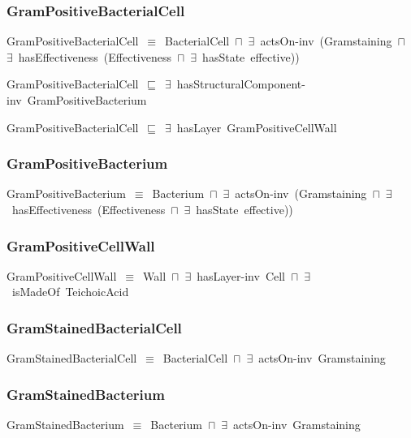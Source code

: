 \documentclass{article}
\begin{document}
\subsubsection*{GramPositiveBacterialCell}

GramPositiveBacterialCell~\ensuremath{\equiv}~BacterialCell~\ensuremath{\sqcap}~\ensuremath{\exists}~actsOn-inv~(Gramstaining~\ensuremath{\sqcap}~\ensuremath{\exists}~hasEffectiveness~(Effectiveness~\ensuremath{\sqcap}~\ensuremath{\exists}~hasState~effective))

GramPositiveBacterialCell~\ensuremath{\sqsubseteq}~\ensuremath{\exists}~hasStructuralComponent-inv~GramPositiveBacterium~

GramPositiveBacterialCell~\ensuremath{\sqsubseteq}~\ensuremath{\exists}~hasLayer~GramPositiveCellWall~

\subsubsection*{GramPositiveBacterium}

GramPositiveBacterium~\ensuremath{\equiv}~Bacterium~\ensuremath{\sqcap}~\ensuremath{\exists}~actsOn-inv~(Gramstaining~\ensuremath{\sqcap}~\ensuremath{\exists}~hasEffectiveness~(Effectiveness~\ensuremath{\sqcap}~\ensuremath{\exists}~hasState~effective))

\subsubsection*{GramPositiveCellWall}

GramPositiveCellWall~\ensuremath{\equiv}~Wall~\ensuremath{\sqcap}~\ensuremath{\exists}~hasLayer-inv~Cell~\ensuremath{\sqcap}~\ensuremath{\exists}~isMadeOf~TeichoicAcid

\subsubsection*{GramStainedBacterialCell}

GramStainedBacterialCell~\ensuremath{\equiv}~BacterialCell~\ensuremath{\sqcap}~\ensuremath{\exists}~actsOn-inv~Gramstaining

\subsubsection*{GramStainedBacterium}

GramStainedBacterium~\ensuremath{\equiv}~Bacterium~\ensuremath{\sqcap}~\ensuremath{\exists}~actsOn-inv~Gramstaining
\end{document}

